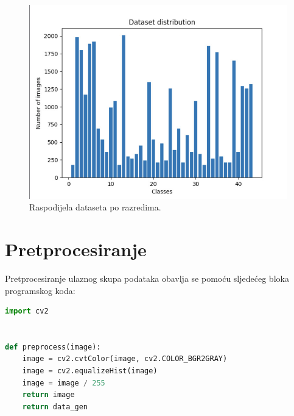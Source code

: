 \documentclass[times, utf8, zavrsni]{fer}
\begin{document}
\begin{figure}[h!]
  \includegraphics[width=\linewidth,trim=4 4 4 4,clip]{images/distribution.jpeg}
  \caption{Raspodijela dataseta po razredima.}
\end{figure}
\pagebreak
\section{Pretprocesiranje}
Pretprocesiranje ulaznog skupa podataka obavlja se pomoću sljedećeg bloka programskog koda:
\begin{lstlisting}[language=Python]
import cv2


def preprocess(image):
    image = cv2.cvtColor(image, cv2.COLOR_BGR2GRAY)
    image = cv2.equalizeHist(image)
    image = image / 255
    return image
    return data_gen
\end{lstlisting}
\end{document}
